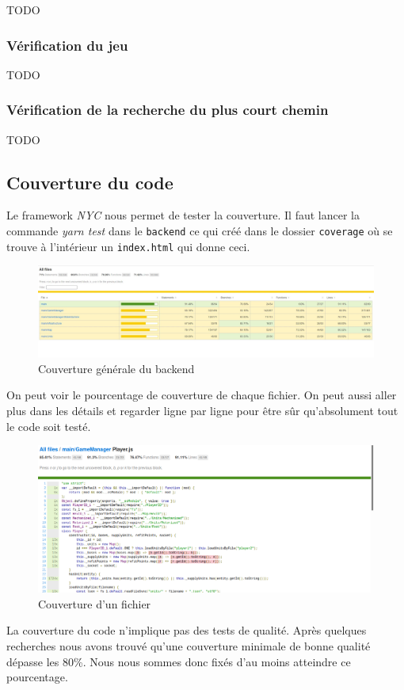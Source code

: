TODO

\subsubsection{Vérification du jeu}

TODO

\subsubsection{Vérification de la recherche du plus court chemin}

TODO

\subsection{Couverture du code}

Le framework \emph{NYC} nous permet de tester la couverture. Il faut lancer la commande \emph{yarn test} dans le \lstinline{backend} ce qui créé dans le dossier \lstinline{coverage} où se trouve à l'intérieur un \lstinline{index.html} qui donne ceci.

\begin{figure}[H]
    \centering
    \includegraphics[scale=0.35]{data/couverture_test_1.jpg}
    \caption{Couverture générale du backend}
\end{figure}

On peut voir le pourcentage de couverture de chaque fichier. On peut aussi aller plus dans les détails et regarder ligne par ligne pour être sûr qu'absolument tout le code soit testé.

\begin{figure}[H]
    \centering
    \includegraphics[scale=0.3]{data/couverture_test_2.png}
    \caption{Couverture d'un fichier}
\end{figure}

La couverture du code n'implique pas des tests de qualité. Après quelques recherches nous avons trouvé qu'une couverture minimale de bonne qualité dépasse les 80\%. Nous nous sommes donc fixés d'au moins atteindre ce pourcentage.